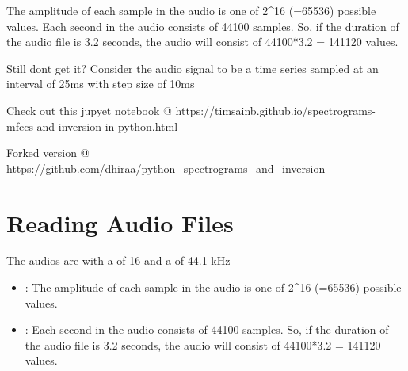 \documentclass[letterpaper,10pt,english]{sphinxmanual}
\begin{document}
 The amplitude of each sample in the audio is one of 2\textasciicircum{}16 (=65536) possible values.
 Each second in the audio consists of 44100 samples. So, if the duration of the audio file is 3.2 seconds, the audio will consist of 44100*3.2 = 141120 values.

Still dont get it? Consider the audio signal to be a time series sampled at an interval of 25ms with step size of 10ms

Check out this jupyet notebook @ https://timsainb.github.io/spectrograms-mfccs-and-inversion-in-python.html

Forked version @ https://github.com/dhiraa/python\_spectrograms\_and\_inversion



\section{Reading Audio Files}
\label{\detokenize{AudioBasics:reading-audio-files}}\label{\detokenize{AudioBasics:reading-audio-files}}
The audios are  with a  of 16 and a  of 44.1 kHz

\begin{itemize}
\item {} 
: The amplitude of each sample in the audio is one of 2\textasciicircum{}16 (=65536) possible values.

\item {} 
: Each second in the audio consists of 44100 samples. So, if the duration of the audio file is 3.2 seconds, the audio will consist of 44100*3.2 = 141120 values.

\end{itemize}
\end{document}
